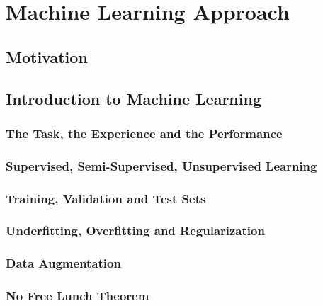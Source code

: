 
\chapter{Machine Learning Approach} %

\label{ChapterML}

\section{Motivation}


\section{Introduction to Machine Learning}
\subsection{The Task, the Experience and the Performance}
\subsection{Supervised, Semi-Supervised, Unsupervised Learning}
\subsection{Training, Validation and Test Sets}
\subsection{Underfitting, Overfitting and Regularization}
\subsection{Data Augmentation}
\subsection{No Free Lunch Theorem}


